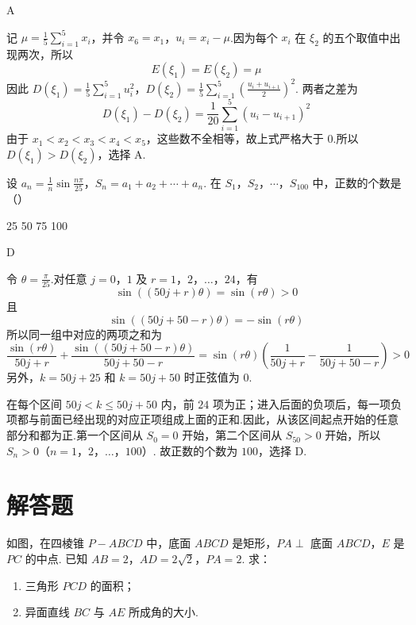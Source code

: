\begin{answer}
A
\end{answer}

\begin{solution}
记 \(\mu=\frac15\sum_{i=1}^5x_i\)，并令 \(x_6=x_1\)，\(u_i=x_i-\mu\).因为每个 \(x_i\) 在 \(\xi_2\) 的五个取值中出现两次，所以
\[
E(\xi_1)=E(\xi_2)=\mu
\]
因此 \(D(\xi_1)=\frac15\sum_{i=1}^5u_i^2\)，\(D(\xi_2)=\frac15\sum_{i=1}^5\left(\frac{u_i+u_{i+1}}2\right)^2\).
两者之差为
\[
D(\xi_1)-D(\xi_2)
=\frac1{20}\sum_{i=1}^5(u_i-u_{i+1})^2
\]
由于 \(x_1<x_2<x_3<x_4<x_5\)，这些数不全相等，故上式严格大于 \(0\).所以 \(D(\xi_1)>D(\xi_2)\)，选择 A.
\end{solution}

\begin{problem}
设 \(a_{n} = \frac{1}{n}\sin \frac{n\pi}{25}\)，\(S_{n} = a_{1} + a_{2} + \cdots + a_{n}\). 在 \(S_{1}\)，\(S_{2}\)，\(\cdots\)，\(S_{100}\) 中，正数的个数是（\quad）

\choices
    {25}
    {50}
    {75}
    {100}
\end{problem}

\begin{answer}
D
\end{answer}

\begin{solution}
令 \(\theta=\frac{\pi}{25}\).对任意 \(j=0\)，\(1\) 及 \(r=1\)，\(2\)，\(\ldots\)，\(24\)，有
\[
\sin((50j+r)\theta)=\sin(r\theta)>0
\]
且
\[
\sin((50j+50-r)\theta)=-\sin(r\theta)
\]
所以同一组中对应的两项之和为
\[
\frac{\sin(r\theta)}{50j+r}+\frac{\sin((50j+50-r)\theta)}{50j+50-r}
=\sin(r\theta)\left(\frac1{50j+r}-\frac1{50j+50-r}\right)>0
\]
另外，\(k=50j+25\) 和 \(k=50j+50\) 时正弦值为 \(0\).

在每个区间 \(50j<k\leqslant50j+50\) 内，前 \(24\) 项为正；进入后面的负项后，每一项负项都与前面已经出现的对应正项组成上面的正和.因此，从该区间起点开始的任意部分和都为正.第一个区间从 \(S_0=0\) 开始，第二个区间从 \(S_{50}>0\) 开始，所以 \(S_n>0\)（\(n=1\)，\(2\)，\(\ldots\)，\(100\)）.
故正数的个数为 \(100\)，选择 D.
\end{solution}

\section{解答题}

\begin{problem}
如图，在四棱锥 \(P - ABCD\) 中，底面 \(ABCD\) 是矩形，\(PA \perp\) 底面 \(ABCD\)，\(E\) 是 \(PC\) 的中点. 已知 \(AB = 2\)，\(AD = 2\sqrt{2}\)，\(PA = 2\). 求：

\begin{enumerate}
\item 三角形 \(PCD\) 的面积；
\item 异面直线 \(BC\) 与 \(AE\) 所成角的大小.
\end{enumerate}

\end{problem}

